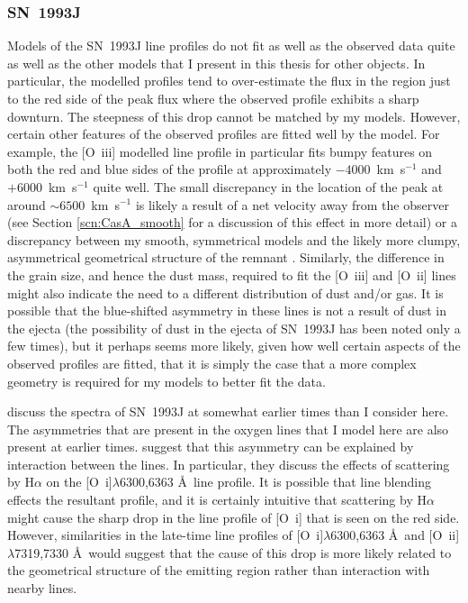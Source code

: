 \subsubsection{SN~1993J}

Models of the SN~1993J line profiles do not fit as well as the observed data quite as well as the other models that I present in this thesis for other objects.  In particular, the modelled profiles tend to over-estimate the flux in the region just to the red side of the peak flux where the observed profile exhibits a sharp downturn.  The steepness of this drop cannot be matched by my models.  However, certain other features of the observed profiles are fitted well by the model.  For example, the [O~{\sc iii}] modelled line profile in particular fits bumpy features on both the red and blue sides of the profile at approximately $-4000$~km~s$^{-1}$ and $+6000$~km~s$^{-1}$ quite well.  The small discrepancy in the location of the peak at around $\sim6500$~km~s$^{-1}$ is likely a result of a net velocity away from the observer (see Section \ref{scn:CasA_smooth} for a discussion of this effect in more detail) or a discrepancy between my smooth, symmetrical models and the likely more clumpy, asymmetrical geometrical structure of the remnant \citep{Tran1997}.  Similarly, the difference in the grain size, and hence the dust mass, required to fit the [O~{\sc iii}] and [O~{\sc ii}] lines might also indicate the need to a different distribution of dust and/or gas.  It is possible that the blue-shifted asymmetry in these lines is not a result of dust in the ejecta (the possibility of dust in the ejecta of SN~1993J has been noted only a few times), but it perhaps seems more likely, given how well certain aspects of the observed profiles are fitted, that it is simply the case that a more complex geometry is required for my models to better fit the data.

\citet{Houck1996} discuss the spectra of SN~1993J at somewhat earlier times than I consider here.  The asymmetries that are present in the oxygen lines that I model here are also present at earlier times.  \citet{Houck1996} suggest that  this asymmetry can be explained by interaction between the lines.  In particular, they discuss the effects of scattering by H$\alpha$ on the [O~{\sc i}]$\lambda$6300,6363 \AA\ line profile.  It is possible that line blending effects the resultant profile, and it is certainly intuitive that scattering by H$\alpha$ might cause the sharp drop in the line profile of [O~{\sc i}] that is seen on the red side.  However, similarities in the late-time line profiles of [O~{\sc i}]$\lambda$6300,6363 \AA\ and [O~{\sc ii}]$\lambda$7319,7330 \AA\ would suggest that  the cause of this drop is more likely related to the geometrical structure of the emitting region rather than interaction with nearby lines.

